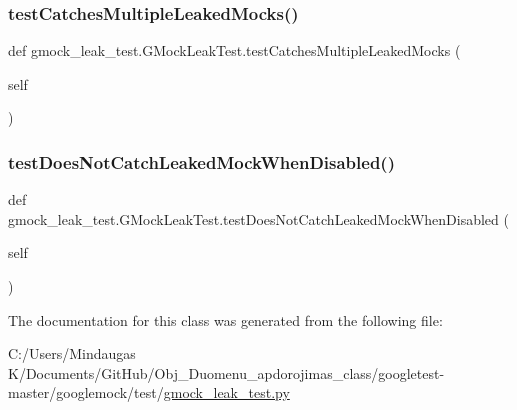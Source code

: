 \mbox{\label{classgmock__leak__test_1_1_g_mock_leak_test_a09465b2bfde98834e4bb9563c035f034}} 
\subsubsection{\texorpdfstring{testCatchesMultipleLeakedMocks()}{testCatchesMultipleLeakedMocks()}}
{\footnotesize\ttfamily def gmock\+\_\+leak\+\_\+test.\+G\+Mock\+Leak\+Test.\+test\+Catches\+Multiple\+Leaked\+Mocks (\begin{DoxyParamCaption}\item[{}]{self }\end{DoxyParamCaption})}

\mbox{\label{classgmock__leak__test_1_1_g_mock_leak_test_a3107bf5a603558ab2d97d88fb5589951}} 
\subsubsection{\texorpdfstring{testDoesNotCatchLeakedMockWhenDisabled()}{testDoesNotCatchLeakedMockWhenDisabled()}}
{\footnotesize\ttfamily def gmock\+\_\+leak\+\_\+test.\+G\+Mock\+Leak\+Test.\+test\+Does\+Not\+Catch\+Leaked\+Mock\+When\+Disabled (\begin{DoxyParamCaption}\item[{}]{self }\end{DoxyParamCaption})}



The documentation for this class was generated from the following file\+:\begin{DoxyCompactItemize}
\item 
C\+:/\+Users/\+Mindaugas K/\+Documents/\+Git\+Hub/\+Obj\+\_\+\+Duomenu\+\_\+apdorojimas\+\_\+class/googletest-\/master/googlemock/test/\mbox{\hyperlink{googletest-master_2googlemock_2test_2gmock__leak__test_8py}{gmock\+\_\+leak\+\_\+test.\+py}}\end{DoxyCompactItemize}
